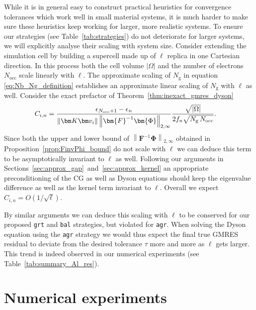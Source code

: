 \documentclass[hidelinks,onefignum,onetabnum]{siamart250211}
\newcommand{\Nocc}{N_{\mathrm{occ}}}
\newcommand{\Ng}{N_{\mathrm{g}}}
\newcommand{\sbal}{\texttt{bal}\xspace}
\newcommand{\sagr}{\texttt{agr}\xspace}
\newcommand{\sgrt}{\texttt{grt}\xspace}
\begin{document}
\begin{remark}\label{rmk:scaling}
While it is in general easy to construct practical heuristics
for convergence tolerances which work well in small material systems,
it is much harder to make sure these heuristics keep working
for larger, more realistic systems.
To ensure our strategies (see Table~\ref{tab:strategies})
do not deteriorate for larger systems, we will explicitly analyse
their scaling with system size.
Consider extending the simulation cell
by building a supercell made up of $\ell$ replica in one Cartesian direction.
In this process both the cell volume $|\Omega|$
and the number of electrons $\Nocc$ scale linearly with $\ell$.
The approximate scaling of $\Ng$ in equation \eqref{eq:Nb_Ng_definition}
establishes an approximate linear scaling of $\Ng$ with $\ell$ as well.
Consider the exact prefactor of Theorem~\ref{thm:inexact_gmres_dyson}
\begin{align*}
    C_{i,n} &=
    \frac{\epsilon_{\Nocc+1} - \epsilon_n}{%
        \left\| \bm K \bm v_i \right\|
        \left\| \bm{F}^{-1}\bm{\Phi} \right\|_{2,\infty}}
    \frac{\sqrt{|\Omega|}}{2 f_n \sqrt{\Ng \, \Nocc}}.
\end{align*}
Since both the upper and lower bound
of $\left\| \bm{F}^{-1}\bm{\Phi} \right\|_{2,\infty}$
obtained in Proposition~\ref{prop:FinvPhi_bound} do not scale with $\ell$
we can deduce this term to be asymptotically invariant to $\ell$ as well.
Following our arguments in Sections~\ref{sec:approx_gap}~and~\ref{sec:approx_kernel}
an appropriate preconditioning of the CG as well as Dyson equations
should keep the eigenvalue difference as well as the kernel
term invariant to $\ell$.
Overall we expect $C_{i,n} = O(1 / \sqrt{\ell})$.
%
%
%
%
%

By similar arguments
we can deduce this scaling
with $\ell$ to be conserved for our proposed \sgrt and \sbal strategies,
but violated for \sagr.
When solving the Dyson equation using the \sagr strategy
we would thus expect the final true GMRES residual to deviate from
the desired tolerance $\tau$ more and more as $\ell$ gets larger.
This trend is indeed observed in our numerical experiments
(see Table~\ref{tab:summary_Al_res}).
\end{remark}

%
%
%

\section{Numerical experiments}
\label{sec:experiments}
\end{document}
